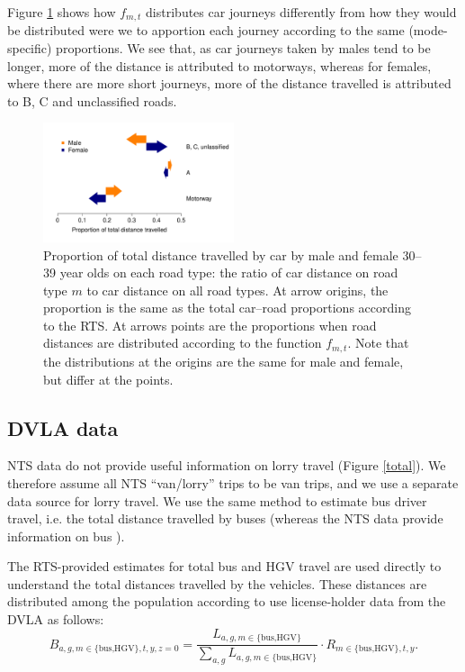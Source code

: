 \documentclass{article}
\begin{document}
Figure \ref{carMF30} shows how $f_{m,t}$ distributes car journeys differently from how they would be distributed were we to apportion each journey according to the same (mode-specific) proportions. We see that, as car journeys taken by males tend to be longer, more of the distance is attributed to motorways, whereas for females, where there are more short journeys, more of the distance travelled is attributed to B, C and unclassified roads.

\begin{figure}[H]
\centering
\includegraphics[width=0.5\textwidth]{carMF30.pdf}
\caption[Proportion of total distance travelled by car by male and female 30--39 year olds on each road type.]{\small Proportion of total distance travelled by car by male and female 30--39 year olds on each road type: the ratio of car distance on road type $m$ to car distance on all road types. At arrow origins, the proportion is the same as the total car--road proportions according to the RTS. At arrows points are the proportions when road distances are distributed according to the function $f_{m,t}$. Note that the distributions at the origins are the same for male and female, but differ at the points.}
\label{carMF30}
\end{figure}


\subsection{DVLA data}\label{dvla}

NTS data do not provide useful information on lorry travel (Figure \ref{total}). We therefore assume all NTS ``van/lorry'' trips to be van trips, and we use a separate data source for lorry travel. We use the same method to estimate bus driver travel, i.e. the total distance travelled by buses (whereas the NTS data provide information on bus ).

The RTS-provided estimates for total bus and HGV travel are used directly to understand the total distances travelled by the vehicles. These distances are distributed among the population according to use license-holder data from the DVLA as follows:
\begin{equation}
B_{a,g,m\in\{\text{bus,HGV}\},t,y,z=0}  = \frac{L_{a,g,m\in\{\text{bus,HGV}\}}}{\sum_{a,g}L_{a,g,m\in\{\text{bus,HGV}\}}}\cdot R_{m\in\{\text{bus,HGV}\},t,y}.
\end{equation}
\end{document}
